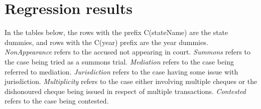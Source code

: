 \section{Regression results}
\label{sec:regression-results-1}
In the tables below, the rows with the prefix C(stateName) are the state dummies, and rows with the C(year) prefix are the year dummies. \emph{NonAppearance} refers to the accused not appearing in court. \emph{Summons} refers to the case being tried as a summons trial. \emph{Mediation} refers to the case being referred to mediation. \emph{Jurisdiction} refers to the case having some issue with jurisdiction. \emph{Multiplicity} refers to the case either involving multiple cheques or the dishonoured cheque being issued in respect of multiple transactions. \emph{Contested} refers to the case being contested.

